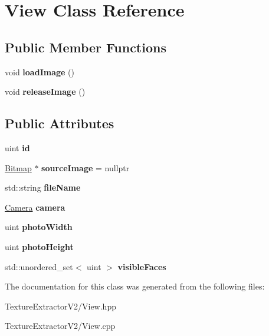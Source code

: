 \hypertarget{class_view}{}\section{View Class Reference}
\label{class_view}
\subsection*{Public Member Functions}
\begin{DoxyCompactItemize}
\item 
\hypertarget{class_view_a58942806f815fc1f34034c1464aa3d57}{}void {\bfseries load\+Image} ()\label{class_view_a58942806f815fc1f34034c1464aa3d57}

\item 
\hypertarget{class_view_aa280b349b020b2fb14863b66d054a1da}{}void {\bfseries release\+Image} ()\label{class_view_aa280b349b020b2fb14863b66d054a1da}

\end{DoxyCompactItemize}
\subsection*{Public Attributes}
\begin{DoxyCompactItemize}
\item 
\hypertarget{class_view_af416d44fcc5e550f9124cb2227b7c971}{}uint {\bfseries id}\label{class_view_af416d44fcc5e550f9124cb2227b7c971}

\item 
\hypertarget{class_view_a6694ecbe37c82f827cc5c861ea6544a7}{}\hyperlink{class_bitmap}{Bitmap} $\ast$ {\bfseries source\+Image} = nullptr\label{class_view_a6694ecbe37c82f827cc5c861ea6544a7}

\item 
\hypertarget{class_view_aa525308d25faadf5093d8c368290fb71}{}std\+::string {\bfseries file\+Name}\label{class_view_aa525308d25faadf5093d8c368290fb71}

\item 
\hypertarget{class_view_ad7f28c9ee1645c5ba3e1164a29227bf2}{}\hyperlink{class_camera}{Camera} {\bfseries camera}\label{class_view_ad7f28c9ee1645c5ba3e1164a29227bf2}

\item 
\hypertarget{class_view_a00c5c1d61a5056a52982e03a6f7f7c70}{}uint {\bfseries photo\+Width}\label{class_view_a00c5c1d61a5056a52982e03a6f7f7c70}

\item 
\hypertarget{class_view_aa6390d1827dd3b222e0a91891c9ff05b}{}uint {\bfseries photo\+Height}\label{class_view_aa6390d1827dd3b222e0a91891c9ff05b}

\item 
\hypertarget{class_view_a1c2f222c8f6060c2d3ecb7c08808fa91}{}std\+::unordered\+\_\+set$<$ uint $>$ {\bfseries visible\+Faces}\label{class_view_a1c2f222c8f6060c2d3ecb7c08808fa91}

\end{DoxyCompactItemize}


The documentation for this class was generated from the following files\+:\begin{DoxyCompactItemize}
\item 
Texture\+Extractor\+V2/View.\+hpp\item 
Texture\+Extractor\+V2/View.\+cpp\end{DoxyCompactItemize}

